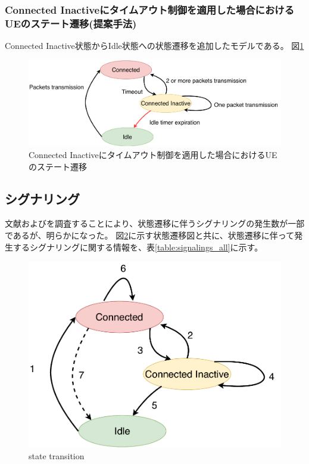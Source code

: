 \documentclass[a4j]{ujarticle}
\begin{document}
    \subsubsection{Connected Inactiveにタイムアウト制御を適用した場合におけるUEのステート遷移(提案手法)}
    Connected Inactive状態からIdle状態への状態遷移を追加したモデルである。
    図\ref{state_change_propose}
    \begin{figure}[htbp]
      \centering
      \includegraphics[width=1.0\hsize]{state_change_propose.pdf}
      \caption{Connected Inactiveにタイムアウト制御を適用した場合におけるUEのステート遷移}
      \label{state_change_propose}
    \end{figure}

    \subsection{シグナリング}
    文献\cite{3gpp.23.720}および\cite{ANovelStateModelfor5GRadioAccessNetworks}を調査することにより、状態遷移に伴うシグナリングの発生数が一部であるが、明らかになった。
    図\ref{state_id}に示す状態遷移図と共に、状態遷移に伴って発生するシグナリングに関する情報を、表\ref{table:signalings_all}に示す。

    \begin{figure}[htbp]
      \centering
      \includegraphics[width=0.9\hsize]{state_id.pdf}
      \caption{state transition}
      \label{state_id}
    \end{figure}
\end{document}
